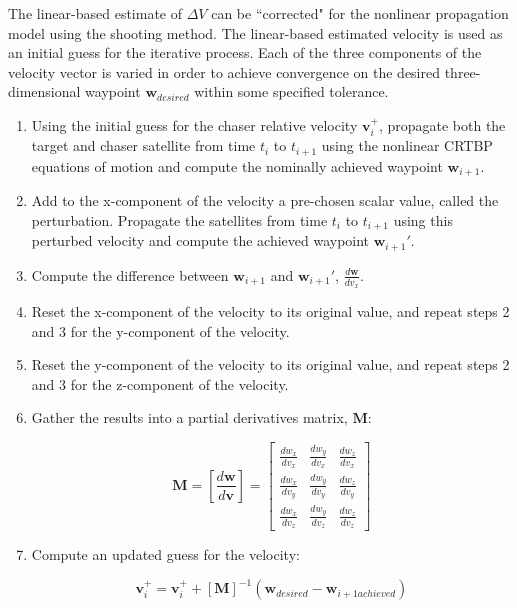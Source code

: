 \documentclass[]{article}
\begin{document}
The linear-based estimate of \(\Delta V\) can be ``corrected" for the nonlinear propagation model using the shooting method.  The linear-based estimated velocity is used as an initial guess for the iterative process.  Each of the three components of the velocity vector is varied in order to achieve convergence on the desired three-dimensional waypoint \(\mathbf{w}_{desired}\) within some specified tolerance.

\begin{enumerate}[leftmargin=!,labelindent=12pt,itemindent=0pt, label=Step \arabic*:]

	\item Using the initial guess for the chaser relative velocity \(\mathbf{v}_i^+\), propagate both the target and chaser satellite from time \(t_i\) to \(t_{i+1}\) using the nonlinear CRTBP equations of motion and compute the nominally achieved waypoint \(\mathbf{w}_{i+1}\).
	
	\item Add to the x-component of the velocity a pre-chosen scalar value, called the perturbation.  Propagate the satellites from time \(t_i\) to \(t_{i+1}\) using this perturbed velocity and compute the achieved waypoint \(\mathbf{w}_{i+1}'\).
	
	\item Compute the difference between \(\mathbf{w}_{i+1}\) and \(\mathbf{w}_{i+1}'\), \(\frac{d\mathbf{w}}{dv_x}\).
	
	\item Reset the x-component of the velocity to its original value, and repeat steps 2 and 3 for the y-component of the velocity.
	
	\item Reset the y-component of the velocity to its original value, and repeat steps 2 and 3 for the z-component of the velocity.
	
	\item Gather the results into a partial derivatives matrix, \(\mathbf{M}\):
	
	\begin{equation}
	\mathbf{M} = \left[ \frac{d\mathbf{w}}{d\mathbf{v}} \right]
	= \begin{bmatrix}
	\frac{dw_x}{dv_x} & \frac{dw_y}{dv_x} & \frac{dw_z}{dv_x} \\[0.3em]
	\frac{dw_x}{dv_y} & \frac{dw_y}{dv_y} & \frac{dw_z}{dv_y} \\[0.3em]
	\frac{dw_x}{dv_z} & \frac{dw_y}{dv_z} & \frac{dw_z}{dv_z}
	\end{bmatrix}
	\end{equation}
	
	\item Compute an updated guess for the velocity:
	
	\begin{equation}
	\mathbf{v}_i^+ = \mathbf{v}_i^+ + [\mathbf{M}]^{-1}(\mathbf{w}_{desired} - \mathbf{w}_{i+1 achieved})
	\end{equation}
	
\end{enumerate}
\end{document}
